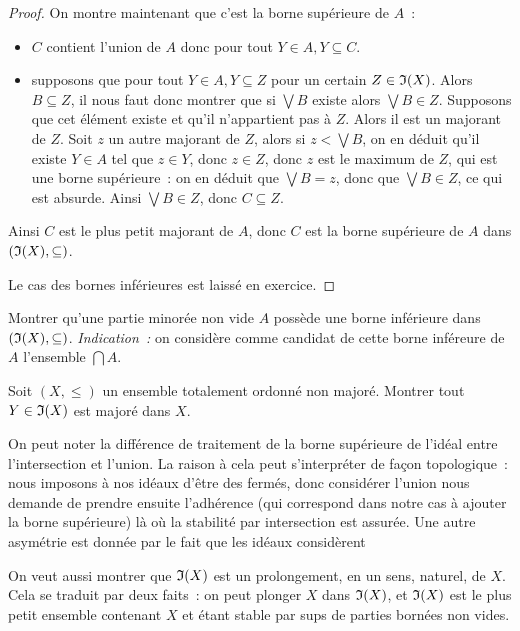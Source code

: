 \begin{proof}
  On montre maintenant que c'est la borne supérieure de $A$~:
  \begin{itemize}
  \item $C$ contient l'union de $A$ donc pour tout $Y\in A, Y\subseteq C$.
  \item supposons que pour tout $Y\in A, Y\subseteq Z$ pour un certain
    $Z\in \mathfrak{I}(X)$. Alors $B\subseteq Z$, il nous faut donc montrer que si
    $\bigvee B$ existe alors $\bigvee B \in Z$. Supposons que cet élément
    existe et qu'il n'appartient pas à $Z$. Alors il est un majorant de $Z$.
    Soit $z$ un autre majorant de $Z$, alors si $z < \bigvee B$, on en déduit
    qu'il existe $Y\in A$ tel que $z\in Y$, donc $z \in Z$, donc $z$ est le
    maximum de $Z$, qui est une borne supérieure~: on en déduit que
    $\bigvee B = z$, donc que $\bigvee B \in Z$, ce qui est absurde. Ainsi
    $\bigvee B \in Z$, donc $C\subseteq Z$.
  \end{itemize}
  Ainsi $C$ est le plus petit majorant de $A$, donc $C$ est la borne supérieure
  de $A$ dans $(\mathfrak{I}(X),\subseteq)$.

  Le cas des bornes inférieures est laissé en exercice.
\end{proof}

\begin{exercise}
  Montrer qu'une partie minorée non vide $A$ possède une borne inférieure dans
  $(\mathfrak{I}(X),\subseteq)$. \textit{Indication~:} on considère comme candidat de
  cette borne inféreure de $A$ l'ensemble $\bigcap A$.
\end{exercise}

\begin{exercise}\label{exo.ide.maj}
  Soit $(X,\leq)$ un ensemble totalement ordonné non majoré. Montrer tout
  $Y \in \mathfrak{I}(X)$ est majoré dans $X$.
\end{exercise}

\begin{remark}
  On peut noter la différence de traitement de la borne supérieure de l'idéal
  entre l'intersection et l'union. La raison à cela peut s'interpréter de façon
  topologique~: nous imposons à nos idéaux d'être des fermés, donc considérer
  l'union nous demande de prendre ensuite l'adhérence (qui correspond dans notre
  cas à ajouter la borne supérieure) là où la stabilité par intersection est
  assurée. Une autre asymétrie est donnée par le fait que les idéaux considèrent
\end{remark}

On veut aussi montrer que $\mathfrak{I}(X)$ est un prolongement, en un sens, naturel,
de $X$. Cela se traduit par deux faits~: on peut plonger $X$ dans $\mathfrak{I}(X)$,
et $\mathfrak{I}(X)$ est le plus petit ensemble contenant $X$ et étant stable par
sups de parties bornées non vides.

